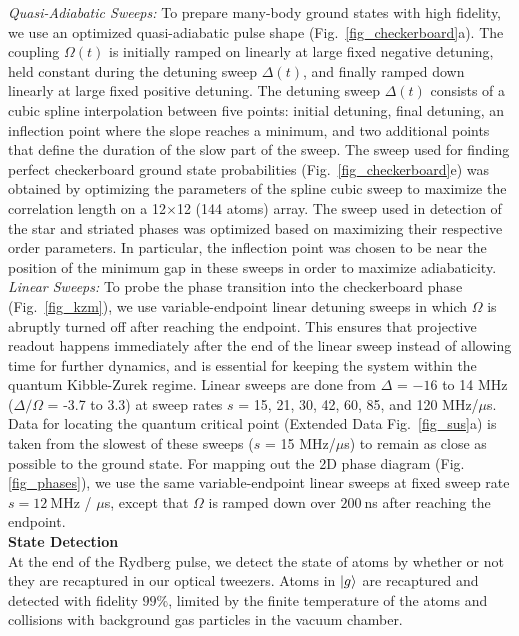\documentclass[reprint,twocolumn,secnumarabic,amssymb, aps, prl]{revtex4-1}
\begin{document}
\noindent\emph{Quasi-Adiabatic Sweeps:} To prepare many-body ground states with high fidelity, we use an optimized quasi-adiabatic pulse shape (Fig.~\ref{fig_checkerboard}a). The coupling $\Omega(t)$ is initially ramped on linearly at large fixed negative detuning, held constant during the detuning sweep $\Delta(t)$, and finally ramped down linearly at large fixed positive detuning. The detuning sweep $\Delta(t)$ consists of a cubic spline interpolation between five points: initial detuning, final detuning, an inflection point where the slope reaches a minimum, and two additional points that define the duration of the slow part of the sweep. The sweep used for finding perfect checkerboard ground state probabilities (Fig.~\ref{fig_checkerboard}e) was obtained by optimizing the parameters of the spline cubic sweep to maximize the correlation length on a 12$\times$12 (144 atoms) array. The sweep used in detection of the star and striated phases was optimized based on maximizing their respective order parameters. In particular, the inflection point was chosen to be near the position of the minimum gap in these sweeps in order to maximize adiabaticity.  \\

\noindent\emph{Linear Sweeps:}  To probe the phase transition into the checkerboard phase (Fig.~\ref{fig_kzm}), we use variable-endpoint linear detuning sweeps in which $\Omega$ is abruptly turned off after reaching the endpoint.
This ensures that projective readout happens immediately after the end of the linear sweep instead of allowing time for further dynamics,
and is essential for keeping the system within the quantum Kibble-Zurek regime. Linear sweeps are done from $\Delta$ = $-16$ to 14 MHz ($\Delta/\Omega$ = -3.7 to 3.3) at sweep rates $s$ = 15, 21, 30, 42, 60, 85, and 120 MHz/$\mu$s. Data for locating the quantum critical point (Extended Data Fig.~\ref{fig_sus}a) is taken from the slowest of these sweeps ($s$ = 15 MHz/$\mu$s) to remain as close as possible to the ground state. For mapping out the 2D phase diagram (Fig. \ref{fig_phases}), we use the same variable-endpoint linear sweeps at fixed sweep rate $s = 12~$MHz / $\mu$s, except that  $\Omega$ is ramped down over $200~$ns after reaching the endpoint.
\\

\noindent\textbf{State Detection}\\
At the end of the Rydberg pulse, we detect the state of atoms by whether or not they are recaptured in our optical tweezers. Atoms in $\ket{g}$ are recaptured and detected with fidelity $99\%$, limited by the finite temperature of the atoms and collisions with background gas particles in the vacuum chamber.
\end{document}
